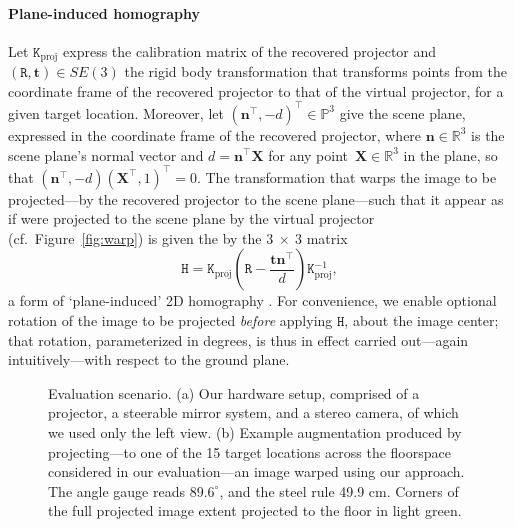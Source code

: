 \documentclass[review]{elsarticle}
\begin{document}
\paragraph{Plane-induced homography} Let $\mathtt{K}_\text{proj}$ express the calibration matrix of the recovered projector and $(\mathtt{R}, \mathbf{t}) \in SE(3)$ the rigid body transformation that transforms points from the coordinate frame of the recovered projector to that of the virtual projector, for a given target location. Moreover, let $(\mathbf{n}^\top, -d)^\top \in \mathbb{P}^3$ give the scene plane, expressed in the coordinate frame of the recovered projector, where $\mathbf{n} \in \mathbb{R}^3$ is the scene plane's normal vector and $d = \mathbf{n}^\top\mathbf{X}$ for any point~$\mathbf{X} \in \mathbb{R}^3$ in the plane, so that $(\mathbf{n}^\top, -d) (\mathbf{X}^\top, 1)^\top = 0$. The transformation that warps the image to be projected---by the recovered projector to the scene plane---such that it appear as if were projected to the scene plane by the virtual projector (cf.\ Figure~\ref{fig:warp}) is given the by the $3~\times~3$ matrix
\begin{equation}
\mathtt{H} = \mathtt{K}_\text{proj}\left(\mathtt{R} - \frac{\mathbf{t}\mathbf{n}^\top}{d}\right)\mathtt{K}_\text{proj}^{-1},
\label{homgen}
\end{equation}
a form of `plane-induced' 2D homography \cite{Hartley2004}. For convenience, we enable optional rotation of the image to be projected \textit{before} applying $\mathtt{H}$, about the image center; that rotation, parameterized in degrees, is thus in effect carried out---again intuitively---with respect to the ground plane.

\begin{figure}
    \centering
    \quad
    \caption{Evaluation scenario. (a) Our hardware setup, comprised of a projector, a steerable mirror system, and a stereo camera, of which we used only the left view. (b) Example augmentation produced by projecting---to one of the 15 target locations across the floorspace considered in our evaluation---an image warped using our approach. The angle gauge reads $89.6^\circ{}$, and the steel rule 49.9 cm. Corners of the full projected image extent projected to the floor in light green.}
    \label{fig:eval}
\end{figure}
\end{document}
